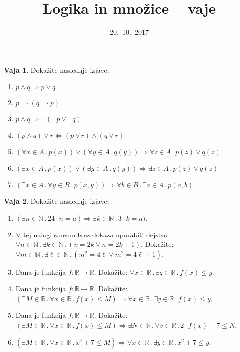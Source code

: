 \documentclass{article}
\newcommand{\RR}{\mathbb{R}}
\newcommand{\NN}{\mathbb{N}}
\newcommand{\lthen}{\Rightarrow}
\newcommand{\liff}{\Leftrightarrow}
\newcommand{\all}[1]{\forall #1 \,.\,}
\newcommand{\some}[1]{\exists #1 \,.\,}
\theoremstyle{definition}
\newtheorem{vaja}{Vaja}
\begin{document}
\title{Logika in množice -- vaje}
\date{20.~10.~2017}
\maketitle

\begin{vaja}
  Dokažite naslednje izjave:
  \begin{enumerate}
  \item $p \land q \lthen p \lor q$
  \item $p \lthen (q \lthen p)$
  \item $p \land q \lthen \lnot (\lnot p \lor \lnot q)$
  \item $(p \land q) \lor r \liff (p \lor r) \land (q \lor r)$
  \item $(\all{x \in A} p(x)) \lor (\all{y \in A} q(y)) \lthen \all{z \in A} p(z) \lor q(z)$
  \item $(\some{x \in A} p(x)) \lor (\some{y \in A} q(y)) \lthen \some{z \in A} p(z) \lor q(z)$
  \item $(\some{x \in A} \all{y \in B} p(x, y)) \lthen \all{b \in B} \some{a \in A} p(a, b)$
  \end{enumerate}
\end{vaja}

\begin{vaja}
  Dokažite naslednje izjave:
  \begin{enumerate}
  \item $(\some{n \in \NN} 24 \cdot n = a) \lthen \some{k \in \NN} 3 \cdot k = a)$.
  \item V tej nalogi smemo brez dokaza uporabiti dejstvo
    $\all{n \in \NN} \some{k \in \NN} (n = 2 k \lor n = 2 k + 1)$. Dokažite:
    $\all{m \in \NN} \some{\ell \in \NN} (m^2 = 4 \ell \lor m^2 = 4 \ell + 1)$.
  \item Dana je funkcija $f : \RR \to \RR$. Dokažite: $\all{x \in \RR} \some{y \in \RR} f(x) \leq y$.
  \item Dana je funkcija $f : \RR \to \RR$. Dokažite: $(\some{M \in \RR} \all{x \in \RR} f(x) \leq M) \lthen \all{x \in \RR} \some{y \in \RR} f(x) \leq y$.
  \item Dana je funkcija $f : \RR \to \RR$. Dokažite: $(\some{M \in \RR} \all{x \in \RR} f(x) \leq M) \lthen \some{N \in \RR} \all {x \in \RR} 2 \cdot f(x) + 7 \leq N$.
  \item $(\some{M \in \RR} \all{x \in \RR} x^2 + 7 \leq M) \lthen \all{x \in \RR} \some{y \in \RR} x^2 + 7 \leq y$.
  \end{enumerate}
\end{vaja}
\end{document}
